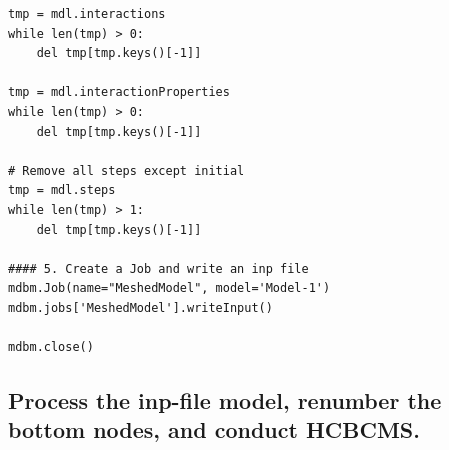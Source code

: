 \documentclass[11pt]{article}
\begin{document}
\begin{enumerate}
\begin{verbatim}
tmp = mdl.interactions
while len(tmp) > 0:
    del tmp[tmp.keys()[-1]]

tmp = mdl.interactionProperties
while len(tmp) > 0:
    del tmp[tmp.keys()[-1]]

# Remove all steps except initial
tmp = mdl.steps
while len(tmp) > 1:
    del tmp[tmp.keys()[-1]]

#### 5. Create a Job and write an inp file
mdbm.Job(name="MeshedModel", model='Model-1')
mdbm.jobs['MeshedModel'].writeInput()

mdbm.close()
\end{verbatim}
\end{enumerate}
\subsection{Process the inp-file model, renumber the bottom nodes, and conduct HCBCMS.}
\label{sec:orgda283eb}
\end{document}
